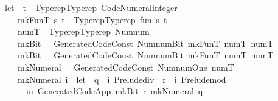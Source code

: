 \begin{isabellebody}
\ \ {\isachardoublequoteopen}{\isacharparenleft}{\kern0pt}let\ {\isacharbraceleft}{\kern0pt}\ t\ {\isacharequal}{\kern0pt}\ Typerep{\isachardot}{\kern0pt}Typerep\ {\isachardoublequote}{\kern0pt}Code{\isacharprime}{\kern0pt}{\isacharunderscore}{\kern0pt}Numeral{\isachardot}{\kern0pt}integer{\isachardoublequote}{\kern0pt}\ {\isacharbrackleft}{\kern0pt}{\isacharbrackright}{\kern0pt}{\isacharsemicolon}{\kern0pt}\isanewline
\ \ \ \ \ mkFunT\ s\ t\ {\isacharequal}{\kern0pt}\ Typerep{\isachardot}{\kern0pt}Typerep\ {\isachardoublequote}{\kern0pt}fun{\isachardoublequote}{\kern0pt}\ {\isacharbrackleft}{\kern0pt}s{\isacharcomma}{\kern0pt}\ t{\isacharbrackright}{\kern0pt}{\isacharsemicolon}{\kern0pt}\isanewline
\ \ \ \ \ numT\ {\isacharequal}{\kern0pt}\ Typerep{\isachardot}{\kern0pt}Typerep\ {\isachardoublequote}{\kern0pt}Num{\isachardot}{\kern0pt}num{\isachardoublequote}{\kern0pt}\ {\isacharbrackleft}{\kern0pt}{\isacharbrackright}{\kern0pt}{\isacharsemicolon}{\kern0pt}\isanewline
\ \ \ \ \ mkBit\ {}\ {\isacharequal}{\kern0pt}\ Generated{\isacharprime}{\kern0pt}{\isacharunderscore}{\kern0pt}Code{\isachardot}{\kern0pt}Const\ {\isachardoublequote}{\kern0pt}Num{\isachardot}{\kern0pt}num{\isachardot}{\kern0pt}Bit{}{\isachardoublequote}{\kern0pt}\ {\isacharparenleft}{\kern0pt}mkFunT\ numT\ numT{\isacharparenright}{\kern0pt}{\isacharsemicolon}{\kern0pt}\isanewline
\ \ \ \ \ mkBit\ {}\ {\isacharequal}{\kern0pt}\ Generated{\isacharprime}{\kern0pt}{\isacharunderscore}{\kern0pt}Code{\isachardot}{\kern0pt}Const\ {\isachardoublequote}{\kern0pt}Num{\isachardot}{\kern0pt}num{\isachardot}{\kern0pt}Bit{}{\isachardoublequote}{\kern0pt}\ {\isacharparenleft}{\kern0pt}mkFunT\ numT\ numT{\isacharparenright}{\kern0pt}{\isacharsemicolon}{\kern0pt}\isanewline
\ \ \ \ \ mkNumeral\ {}\ {\isacharequal}{\kern0pt}\ Generated{\isacharprime}{\kern0pt}{\isacharunderscore}{\kern0pt}Code{\isachardot}{\kern0pt}Const\ {\isachardoublequote}{\kern0pt}Num{\isachardot}{\kern0pt}num{\isachardot}{\kern0pt}One{\isachardoublequote}{\kern0pt}\ numT{\isacharsemicolon}{\kern0pt}\isanewline
\ \ \ \ \ mkNumeral\ i\ {\isacharequal}{\kern0pt}\ let\ {\isacharbraceleft}{\kern0pt}\ q\ {\isacharequal}{\kern0pt}\ i\ {\isacharbackquote}{\kern0pt}Prelude{\isachardot}{\kern0pt}div{\isacharbackquote}{\kern0pt}\ {}{\isacharsemicolon}{\kern0pt}\ r\ {\isacharequal}{\kern0pt}\ i\ {\isacharbackquote}{\kern0pt}Prelude{\isachardot}{\kern0pt}mod{\isacharbackquote}{\kern0pt}\ {}\ {\isacharbraceright}{\kern0pt}\isanewline
\ \ \ \ \ \ \ in\ Generated{\isacharprime}{\kern0pt}{\isacharunderscore}{\kern0pt}Code{\isachardot}{\kern0pt}App\ {\isacharparenleft}{\kern0pt}mkBit\ r{\isacharparenright}{\kern0pt}\ {\isacharparenleft}{\kern0pt}mkNumeral\ q{\isacharparenright}{\kern0pt}{\isacharsemicolon}{\kern0pt}\isanewline

\end{isabellebody}

